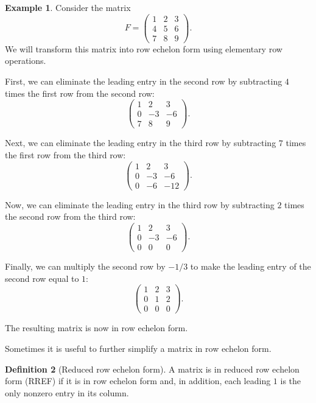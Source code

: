 \documentclass[11pt]{article}
\theoremstyle{definition}
\newtheorem{definition}{Definition}[section]
\newtheorem{example}[definition]{Example}
\theoremstyle{plain}
\theoremstyle{remark}
\begin{document}
\begin{example}\label{ex:F}
    Consider the matrix
    \[F = \begin{pmatrix}
        1 & 2 & 3 \\
        4 & 5 & 6 \\
        7 & 8 & 9
    \end{pmatrix}.\]
    We will transform this matrix into row echelon form using elementary row operations.

    First, we can eliminate the leading entry in the second row by subtracting $4$ times the first row from the second row:
    \[\begin{pmatrix}
        1 & 2 & 3 \\
        0 & -3 & -6 \\
        7 & 8 & 9
    \end{pmatrix}.\]

    Next, we can eliminate the leading entry in the third row by subtracting $7$ times the first row from the third row:
    \[\begin{pmatrix}
        1 & 2 & 3 \\
        0 & -3 & -6 \\
        0 & -6 & -12
    \end{pmatrix}.\]

    Now, we can eliminate the leading entry in the third row by subtracting $2$ times the second row from the third row:
    \[\begin{pmatrix}
        1 & 2 & 3 \\
        0 & -3 & -6 \\
        0 & 0 & 0
    \end{pmatrix}.\]

    Finally, we can multiply the second row by $-1/3$ to make the leading entry of the second row equal to $1$:
    \[\begin{pmatrix}
        1 & 2 & 3 \\
        0 & 1 & 2 \\
        0 & 0 & 0
    \end{pmatrix}.\]

    The resulting matrix is now in row echelon form.
\end{example}

Sometimes it is useful to further simplify a matrix in row echelon form.

\begin{definition}[Reduced row echelon form]
    A matrix is in reduced row echelon form (RREF) if it is in row echelon form and, in addition, each leading $1$ is the only nonzero entry in its column.
\end{definition}
\end{document}
